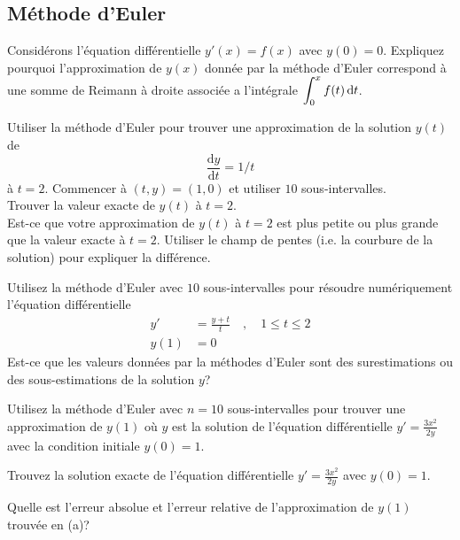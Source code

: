 \subsection{Méthode d'Euler}

\begin{question}[\theory]
Considérons l'équation différentielle $y'(x)=f(x)$ avec $y(0) = 0$.
Expliquez pourquoi l'approximation de $y(x)$ donnée par la méthode
d'Euler correspond à une somme de Reimann à droite associée a
l'intégrale $\displaystyle \int_0^x f(t) \,\mathrm{d}t $.
\label{10Q57}
\end{question}

\begin{question}[\eng]
 Utiliser la méthode d'Euler pour trouver une approximation de
la solution $y(t)$ de
\[
\frac{\text{d}y}{\text{d}t} = 1/t
\]
à $t=2$.  Commencer à $(t,y) = (1,0)$ et utiliser $10$
sous-intervalles. \\
 Trouver la valeur exacte de $y(t)$ \`a $t = 2$.\\
 Est-ce que votre approximation de $y(t)$ à $t=2$ est plus
petite ou plus grande que la valeur exacte à $t=2$.  Utiliser le champ
de pentes (i.e. la courbure de la solution) pour expliquer la différence.
\label{10Q58}
\end{question}

\begin{question}[\eng]
Utilisez la méthode d'Euler avec $10$ sous-intervalles pour résoudre
numériquement l'équation différentielle
\begin{align*}
y' &= \frac{y + t}{t} \quad , \quad 1 \leq t \leq 2 \\
y(1) &= 0
\end{align*}
Est-ce que les valeurs données par la méthodes d'Euler sont des
surestimations ou des sous-estimations de la solution $y$?
\label{10Q59}
\end{question}

\begin{question}[\eng]
 Utilisez la méthode d'Euler avec $n=10$ sous-intervalles pour
trouver une approximation de $y(1)$ où $y$ est la solution de l'équation
différentielle $\displaystyle y'=\frac{3x^2}{2y}$ avec la condition
initiale $y(0)=1$.

 Trouvez la solution exacte de l'équation différentielle
$y'=\frac{3x^2}{2y}$ avec $y(0)=1$.

 Quelle est l'erreur absolue et l'erreur relative de
l'approximation de $y(1)$ trouvée en (a)?
\label{10Q60}
\end{question}


